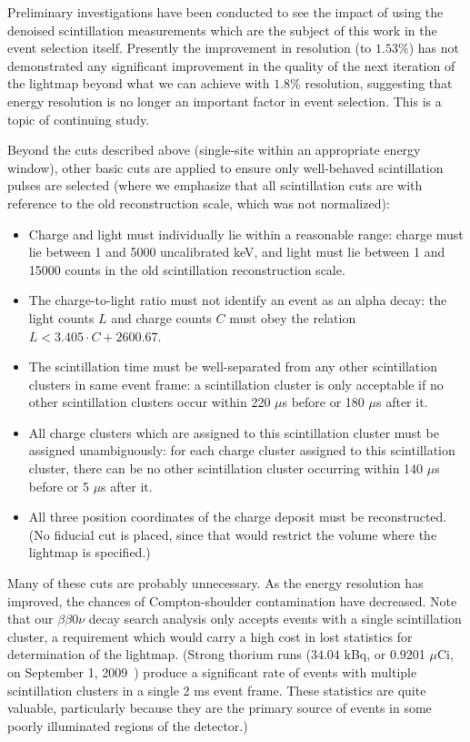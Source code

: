 Preliminary investigations have been conducted to see the impact of using the denoised scintillation measurements which are the subject of this work in the event selection itself.  Presently the improvement in resolution (to $1.53\%$) has not demonstrated any significant improvement in the quality of the next iteration of the lightmap beyond what we can achieve with $1.8\%$ resolution, suggesting that energy resolution is no longer an important factor in event selection. This is a topic of continuing study.

Beyond the cuts described above (single-site within an appropriate energy window), other basic cuts are applied to ensure only well-behaved scintillation pulses are selected (where we emphasize that all scintillation cuts are with reference to the old reconstruction scale, which was not normalized):
\begin{itemize}
\item Charge and light must individually lie within a reasonable range: charge must lie between 1 and 5000 uncalibrated keV, and light must lie between 1 and 15000 counts in the old scintillation reconstruction scale.
\item The charge-to-light ratio must not identify an event as an alpha decay: the light counts $L$ and charge counts $C$ must obey the relation $L < 3.405\cdot C + 2600.67$.
\item The scintillation time must be well-separated from any other scintillation clusters in same event frame: a scintillation cluster is only acceptable if no other scintillation clusters occur within 220 $\mu$s before or 180 $\mu$s after it.
\item All charge clusters which are assigned to this scintillation cluster must be assigned unambiguously: for each charge cluster assigned to this scintillation cluster, there can be no other scintillation cluster occurring within 140 $\mu$s before or 5 $\mu$s after it.
\item All three position coordinates of the charge deposit must be reconstructed.  (No fiducial cut is placed, since that would restrict the volume where the lightmap is specified.)
\end{itemize}
Many of these cuts are probably unnecessary. As the energy resolution has improved, the chances of Compton-shoulder contamination have decreased. Note that our $\beta\beta 0\nu$ decay search analysis only accepts events with a single scintillation cluster, a requirement which would carry a high cost in lost statistics for determination of the lightmap.  (Strong thorium runs ($34.04$ kBq, or 0.9201 $\mu$Ci, on September 1, 2009~\cite{SourceCertificates}) produce a significant rate of events with multiple scintillation clusters in a single 2 ms event frame.  These statistics are quite valuable, particularly because they are the primary source of events in some poorly illuminated regions of the detector.)  


